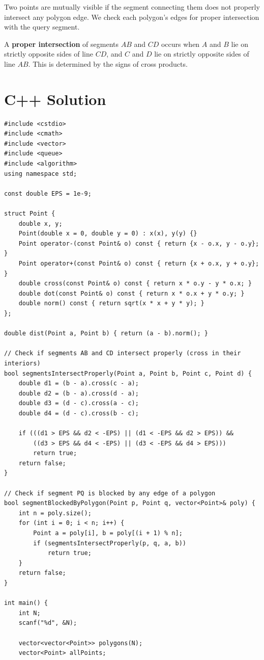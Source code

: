 \documentclass[11pt,a4paper]{article}
\begin{document}
Two points are mutually visible if the segment connecting them does not properly
intersect any polygon edge. We check each polygon's edges for proper intersection
with the query segment.

A \textbf{proper intersection} of segments $AB$ and $CD$ occurs when $A$ and $B$
lie on strictly opposite sides of line $CD$, and $C$ and $D$ lie on strictly opposite
sides of line $AB$. This is determined by the signs of cross products.

\section{C++ Solution}

\begin{lstlisting}
#include <cstdio>
#include <cmath>
#include <vector>
#include <queue>
#include <algorithm>
using namespace std;

const double EPS = 1e-9;

struct Point {
    double x, y;
    Point(double x = 0, double y = 0) : x(x), y(y) {}
    Point operator-(const Point& o) const { return {x - o.x, y - o.y}; }
    Point operator+(const Point& o) const { return {x + o.x, y + o.y}; }
    double cross(const Point& o) const { return x * o.y - y * o.x; }
    double dot(const Point& o) const { return x * o.x + y * o.y; }
    double norm() const { return sqrt(x * x + y * y); }
};

double dist(Point a, Point b) { return (a - b).norm(); }

// Check if segments AB and CD intersect properly (cross in their interiors)
bool segmentsIntersectProperly(Point a, Point b, Point c, Point d) {
    double d1 = (b - a).cross(c - a);
    double d2 = (b - a).cross(d - a);
    double d3 = (d - c).cross(a - c);
    double d4 = (d - c).cross(b - c);

    if (((d1 > EPS && d2 < -EPS) || (d1 < -EPS && d2 > EPS)) &&
        ((d3 > EPS && d4 < -EPS) || (d3 < -EPS && d4 > EPS)))
        return true;
    return false;
}

// Check if segment PQ is blocked by any edge of a polygon
bool segmentBlockedByPolygon(Point p, Point q, vector<Point>& poly) {
    int n = poly.size();
    for (int i = 0; i < n; i++) {
        Point a = poly[i], b = poly[(i + 1) % n];
        if (segmentsIntersectProperly(p, q, a, b))
            return true;
    }
    return false;
}

int main() {
    int N;
    scanf("%d", &N);

    vector<vector<Point>> polygons(N);
    vector<Point> allPoints;


\end{lstlisting}
\end{document}
